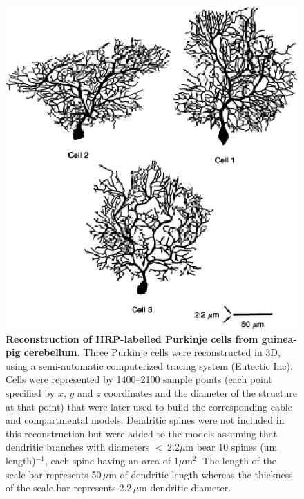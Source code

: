 \documentclass[12pt]{article}
\begin{document}
\begin{figure}[h]
\centering
   \includegraphics[scale=1]{figures/Fig.3.eps}
   \caption{{\bf Reconstruction of HRP-labelled Purkinje cells from guinea-pig cerebellum.}
Three Purkinje cells were reconstructed in 3D, using a semi-automatic computerized tracing system (Eutectic Inc). Cells were represented by 1400--2100 sample points (each point specified by $x$, $y$ and $z$ coordinates and the diameter of the structure at that point) that were later used to build the corresponding cable and compartmental models. Dendritic spines were not included in this reconstruction but were added to the models assuming that dendritic branches with diameters $<$\,2.2$\mu$m bear 10 spines (um length)$^{-1}$, each spine having an area of 1$\mu$m$^2$. The length of the scale bar represents 50\,$\mu$m of dendritic length whereas the thickness of the scale bar represents 2.2\,$\mu$m dendritic diameter.}
   \label{fig:R.3}
\end{figure}



\end{document}
